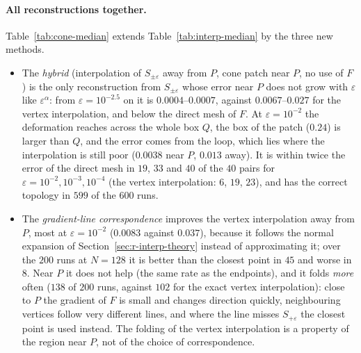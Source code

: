 \documentclass[12pt, a4paper]{article}
\theoremstyle{plain}
\theoremstyle{definition}
\theoremstyle{remark}
\theoremstyle{definition}
\begin{document}
\paragraph{All reconstructions together.} Table~\ref{tab:cone-median} extends
Table~\ref{tab:interp-median} by the three new methods.
\begin{itemize}
    \item The \emph{hybrid} (interpolation of $S_{\pm\varepsilon}$ away from $P$, cone
          patch near $P$, no use of $F$) is the only reconstruction from
          $S_{\pm\varepsilon}$ whose error near $P$ does not grow with $\varepsilon$
          like $\varepsilon^\alpha$: from $\varepsilon=10^{-2.5}$ on it is
          $0.0004$--$0.0007$, against $0.0067$--$0.027$ for the vertex
          interpolation, and below the direct mesh of $F$. At $\varepsilon=10^{-2}$
          the deformation reaches across the whole box $Q$, the box of the patch
          ($0.24$) is larger than $Q$, and the error comes from the loop, which lies
          where the interpolation is still poor ($0.0038$ near $P$, $0.013$ away).
          It is within twice the error of the direct mesh in $19$, $33$ and $40$ of
          the $40$ pairs for $\varepsilon=10^{-2},10^{-3},10^{-4}$ (the vertex
          interpolation: $6$, $19$, $23$), and has the correct topology in $599$ of
          the $600$ runs.
    \item The \emph{gradient-line correspondence} improves the vertex interpolation
          away from $P$, most at $\varepsilon=10^{-2}$ ($0.0083$ against $0.037$),
          because it follows the normal expansion of
          Section~\ref{sec:r-interp-theory} instead of approximating it; over the
          $200$ runs at $N=128$ it is better than the closest point in $45$ and worse
          in $8$. Near $P$ it does not help (the same rate as the endpoints), and it
          folds \emph{more} often ($138$ of $200$ runs, against $102$ for the exact
          vertex interpolation): close to $P$ the gradient of $F$ is small and changes
          direction quickly, neighbouring vertices follow very different lines, and
          where the line misses $S_{+\varepsilon}$ the closest point is used instead.
          The folding of the vertex interpolation is a property of the region near
          $P$, not of the choice of correspondence.
\end{itemize}
\end{document}
